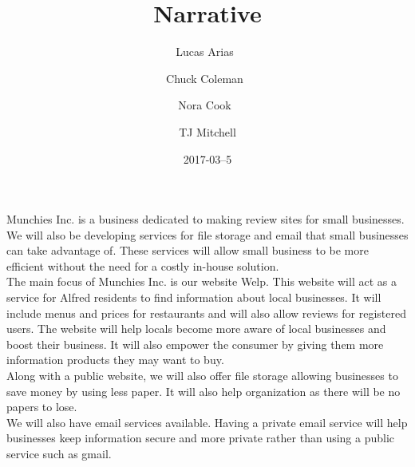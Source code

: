 \documentclass[14pt]{article}
\title{Narrative}
\date{2017-03--5}
\author{Lucas Arias\
        \and
        Chuck Coleman\
        \and
        Nora Cook\
        \and
        TJ Mitchell
        }
\begin{document}
        \maketitle
        \newpage

        Munchies Inc. is a business dedicated to making review sites for small
        businesses. We will also be developing services for file storage and email 
        that small businesses can take advantage of. These services will allow 
        small business to be more efficient without the need for a costly in-house
        solution.\\

        The main focus of Munchies Inc. is our website Welp. This website will
        act as a service for Alfred residents to find information about local 
        businesses. It will include menus and prices for restaurants and will 
        also allow reviews for registered users. The website will help locals 
        become more aware of local businesses and boost their business. It will 
        also empower the consumer by giving them more information products they
        may want to buy.\\

        Along with a public website, we will also offer file storage allowing
        businesses to save money by using less paper. It will also help 
        organization as there will be no papers to lose.\\

        We will also have email services available. Having a private email service
        will help businesses keep information secure and more private rather than
        using a public service such as gmail.\\
\end{document}
